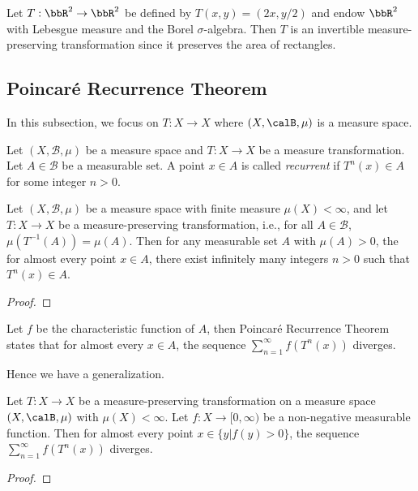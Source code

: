     \begin{example}\label{eg:measurable_transformation_on_R2}
        Let \(T:\bbR^2 \to \bbR^2\) be defined by \(T(x,y) = (2x, y/2)\) and endow \(\bbR^2\) with Lebesgue measure and the Borel \(\sigma\)-algebra.
        Then \(T\) is an invertible measure-preserving transformation since it preserves the area of rectangles.
    \end{example}

\subsection{Poincar\'e Recurrence Theorem}

    In this subsection, we focus on \(T: X \to X\) where \((X, \calB, \mu)\) is a measure space.

    \begin{definition}\label{def:recurrent}
        Let \((X, \mathcal{B}, \mu)\) be a measure space and \(T: X \to X\) be a measure transformation.
        Let \(A \in \mathcal{B}\) be a measurable set.
        A point \(x \in A\) is called \emph{recurrent} if \(T^n(x) \in A\) for some integer \(n > 0\).
    \end{definition}

    \begin{theorem}\label{thm:poincare_recurrence_theorem}
        Let $(X, \mathcal{B}, \mu)$ be a measure space with finite measure $\mu(X) < \infty$, 
        and let $T: X \to X$ be a measure-preserving transformation, i.e., for all $A \in \mathcal{B}$, $\mu(T^{-1}(A)) = \mu(A)$. 
        Then for any measurable set $A$ with $\mu(A) > 0$, the for almost every point \(x \in A\), there exist infinitely many integers \(n > 0\) such that \(T^n(x) \in A\).
    \end{theorem}
    \begin{proof}
    \end{proof}

    Let \(f\) be the characteristic function of \(A\), then Poincar\'e Recurrence Theorem states that for almost every \(x \in A\), the sequence \(\sum_{n=1}^{\infty} f(T^n(x))\) diverges.

    Hence we have a generalization.

    \begin{theorem}\label{thm:generalized_poincare_recurrence_theorem}
        Let \(T:X \to X\) be a measure-preserving transformation on a measure space \((X, \calB, \mu)\) with \(\mu(X) < \infty\). 
        Let \(f: X \to [0, \infty)\) be a non-negative measurable function.
        Then for almost every point \(x \in \{y| f(y) > 0\}\), the sequence \(\sum_{n=1}^{\infty} f(T^n(x))\) diverges.
    \end{theorem}
    \begin{proof}
    \end{proof}



